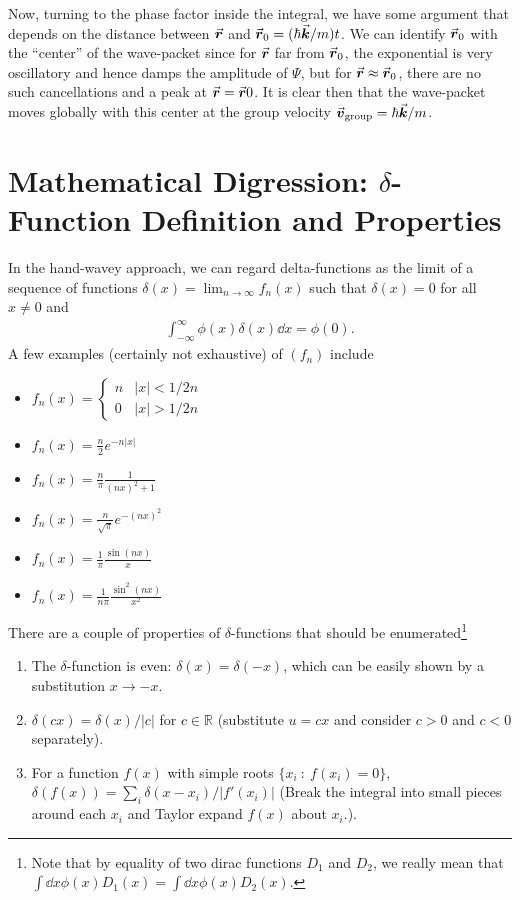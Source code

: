 Now, turning to the phase factor inside the integral, we have some argument that depends on the distance between $\va*{r}$ and $\va*{r}_{0} = (\hbar \va*{k} / m) t$.
We can identify $\va*{r}_{0}$ with the ``center'' of the wave-packet since for $\va*{r}$ far from $\va*{r}_0$, the exponential is very oscillatory and hence damps the amplitude of $\Psi$, but for $\va*{r} \approx \va*{r}_{0}$, there are no such cancellations and a peak at $\va*{r} = \va*{r}0$.
It is clear then that the wave-packet moves globally with this center at the group velocity $\va*{v}_{\rm group} = \hbar \va*{k}/m$.


\section{Mathematical Digression: $\delta$-Function Definition and Properties}

In the hand-wavey approach, we can regard delta-functions as the limit of a sequence of functions $\delta(x) = \lim_{n \rightarrow \infty} f_{n}(x)$ such that $\delta(x) = 0$ for all $x \ne 0$ and 
\begin{eqnarray}
    \int_{-\infty}^{\infty} \phi(x) \delta(x) \dd{x} = \phi(0)
.\end{eqnarray}
A few examples (certainly not exhaustive) of $(f_{n})$ include
\begin{itemize}
    \item $\displaystyle f_{n}(x) = \begin{cases} n & |x| < 1/2n \\ 0 & |x| > 1/2n\end{cases}$
    \item $\displaystyle f_{n}(x) = \frac{n}{2} e^{-n |x|}$
    \item $\displaystyle f_{n}(x) = \frac{n}{\pi} \frac{1}{(nx)^2 + 1}$
    \item $\displaystyle f_{n}(x) = \frac{n}{\sqrt{\pi}} e^{-(nx)^2}$
    \item $\displaystyle f_{n}(x) = \frac{1}{\pi} \frac{\sin(nx)}{x}$
    \item $\displaystyle f_{n}(x) = \frac{1}{n \pi} \frac{\sin^2(nx)}{x^2}$
\end{itemize}

There are a couple of properties of $\delta$-functions that should be enumerated\footnote{Note that by equality of two dirac functions $D_{1}$ and $D_{2}$, we really mean that $\int \dd{x} \phi(x) D_1(x) = \int \dd{x} \phi(x) D_2(x)$.}
\begin{enumerate}
    \item The $\delta$-function is even: $\delta(x) = \delta(-x)$, which can be easily shown by a substitution $x \rightarrow -x$.
    \item $\delta(cx) = \delta(x)/|c|$ for $c \in \mathbb{R}$ (substitute $u = cx$ and consider $c > 0$ and $c < 0$ separately).
    \item For a function $f(x)$ with simple roots $\{ x_{i} ~:~ f(x_{i}) = 0 \}$, $\delta(f(x)) = \sum_{i} \delta(x - x_{i})/|f'(x_{i})|$ (Break the integral into small pieces around each $x_{i}$ and Taylor expand $f(x)$ about $x_{i}$.).
\end{enumerate}

